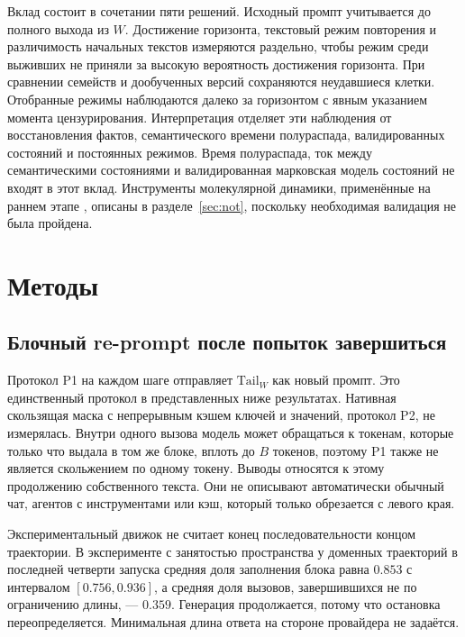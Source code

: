 \documentclass[10pt]{article}
\begin{document}
Вклад состоит в сочетании пяти решений.
Исходный промпт учитывается до полного выхода из $W$.
Достижение горизонта, текстовый режим повторения и различимость начальных
текстов измеряются раздельно, чтобы режим среди выживших не приняли
за высокую вероятность достижения горизонта.
При сравнении семейств и дообученных версий сохраняются неудавшиеся клетки.
Отобранные режимы наблюдаются далеко за горизонтом с явным указанием
момента цензурирования.
Интерпретация отделяет эти наблюдения от восстановления фактов,
семантического времени полураспада, валидированных состояний
и постоянных режимов.
Время полураспада, ток между семантическими состояниями и валидированная
марковская модель состояний не входят в этот вклад.
Инструменты молекулярной динамики, применённые на раннем этапе
\citep{wu2020vampnets,paul2019core}, описаны в разделе~\ref{sec:not},
поскольку необходимая валидация не была пройдена.

\section{Методы}
\label{sec:methods}

\subsection{Блочный re-prompt после попыток завершиться}
\label{sec:process}

Протокол P1 на каждом шаге отправляет $\mathrm{Tail}_W$ как новый промпт.
Это единственный протокол в представленных ниже результатах.
Нативная скользящая маска с непрерывным кэшем ключей и значений,
протокол P2, не измерялась.
Внутри одного вызова модель может обращаться к токенам, которые
только что выдала в том же блоке, вплоть до $B$ токенов,
поэтому P1 также не является скольжением по одному токену.
Выводы относятся к этому продолжению собственного текста.
Они не описывают автоматически обычный чат, агентов с инструментами
или кэш, который только обрезается с левого края.

Экспериментальный движок не считает конец последовательности
концом траектории.
В эксперименте с занятостью пространства у доменных траекторий
в последней четверти запуска средняя доля заполнения блока равна
$0.853$ с интервалом $[0.756, 0.936]$, а средняя доля вызовов,
завершившихся не по ограничению длины, --- $0.359$. %
Генерация продолжается, потому что остановка переопределяется.
Минимальная длина ответа на стороне провайдера не задаётся.
\end{document}
